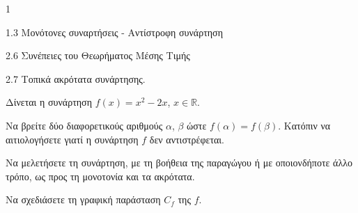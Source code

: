\begin{ylh}{1}
    \item 1.3 Μονότονες συναρτήσεις - Αντίστροφη συνάρτηση
    \item 2.6 Συνέπειες του Θεωρήματος Μέσης Τιμής
    \item 2.7 Τοπικά ακρότατα συνάρτησης.
\end{ylh}
Δίνεται η συνάρτηση $f(x)=x^2-2x$, $x \in \mathbb{R}$.
\begin{alist}
\item Να βρείτε δύο διαφορετικούς αριθμούς $\alpha$, $\beta$ ώστε $f(\alpha)=f(\beta)$. Κατόπιν να αιτιολογήσετε γιατί η συνάρτηση $f$ δεν αντιστρέφεται. 
\item Να μελετήσετε τη συνάρτηση, με τη βοήθεια της παραγώγου ή με οποιονδήποτε άλλο τρόπο, ως προς τη μονοτονία και τα ακρότατα. 
\item Να σχεδιάσετε τη γραφική παράσταση $C_f$ της $f$. 
\end{alist}
